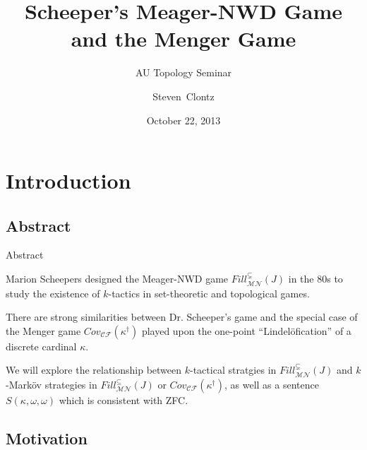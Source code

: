 \documentclass{beamer}
\title
{Scheeper's Meager-NWD Game and the Menger Game}
\subtitle
{AU Topology Seminar} %
\author%
{Steven~Clontz}%
\institute[Auburn University] %
{
  Department of Mathematics and Statistics\\
  Auburn University}
\date[13-10-22] %
{October 22, 2013}
\theoremstyle{theorem}
\theoremstyle{definition}
\newcommand{\oneptlind}[1]{#1^\dagger}
\newcommand{\mengame}[1]{Cov_{\pl C\pl F}(#1)}
\newcommand{\fillgame}[1]{Fill^{\subseteq}_{\pl M\pl N}(#1)}
\newcommand{\sfillgame}[1]{Fill^{\subsetneq}_{\pl M\pl N}(#1)}
\newcommand{\<}{\langle}
\renewcommand{\>}{\rangle}
\newcommand{\pl}[1]{\mathscr{#1}}
\begin{document}

\begin{frame}
  \titlepage
\end{frame}




\section{Introduction}

\subsection{Abstract}

\begin{frame}{Abstract}%

    Marion Scheepers designed the Meager-NWD game $\sfillgame{J}$ in the 80s to study the existence of $k$-tactics in set-theoretic and topological games.

    \pause
    \vspace{12pt}

    There are strong similarities between Dr. Scheeper's game and the special case of the Menger game $\mengame{\oneptlind{\kappa}}$ played upon the one-point ``Lindel\"ofication'' of a discrete cardinal $\kappa$.

    \pause
    \vspace{12pt}

    We will explore the relationship between $k$-tactical stratgies in $\sfillgame{J}$ and $k$-Mark\"ov strategies in $\fillgame{J}$ or $\mengame{\oneptlind{\kappa}}$, as well as a sentence $S(\kappa,\omega,\omega)$ which is consistent with ZFC.
\end{frame}

\subsection{Motivation}
\end{document}
